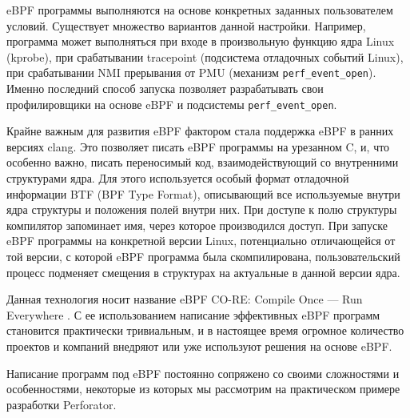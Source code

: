 eBPF программы выполняются на основе конкретных заданных пользователем условий.
Существует множество вариантов данной настройки.
Например, программа может выполняться при входе в произвольную функцию ядра Linux (kprobe), при срабатывании tracepoint (подсистема
отладочных событий Linux), при срабатывании NMI прерывания от PMU (механизм \verb!perf_event_open!).
Именно последний способ запуска позволяет разрабатывать свои профилировщики на основе eBPF и подсистемы \verb!perf_event_open!.

Крайне важным для развития eBPF фактором стала поддержка eBPF в ранних версиях clang.
Это позволяет писать eBPF программы на урезанном C, и, что особенно важно, писать переносимый код, взаимодействующий со внутренними
структурами ядра. Для этого используется особый формат отладочной информации BTF (BPF Type Format), описывающий все используемые внутри
ядра структуры и положения полей внутри них. При доступе к полю структуры компилятор запоминает имя, через которое производился доступ.
При запуске eBPF программы на конкретной версии Linux, потенциально отличающейся от той версии, с которой eBPF программа была
скомпилирована, пользовательский процесс подменяет смещения в структурах на актуальные в данной версии ядра.

Данная технология носит название eBPF CO-RE: Compile Once --- Run Everywhere \cite{ebpf:core}.
С ее использованием написание эффективных eBPF программ становится практически тривиальным, и в настоящее время
огромное количество проектов и компаний внедряют или уже используют решения на основе eBPF.

Написание программ под eBPF постоянно сопряжено со своими сложностями и особенностями,
некоторые из которых мы рассмотрим на практическом примере разработки Perforator.
